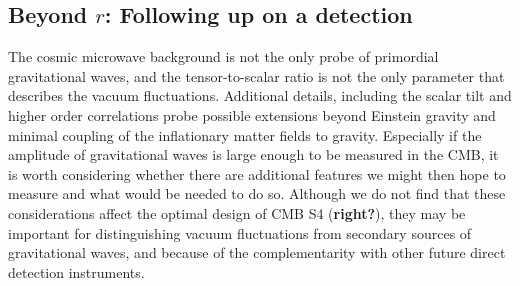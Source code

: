 \subsection{Beyond $r$: Following up on a detection}
\label{sec:beyond_r}
The cosmic microwave background is not the only probe of primordial gravitational waves, and the tensor-to-scalar ratio is not the only parameter that describes the vacuum fluctuations. Additional details, including the scalar tilt and higher order correlations probe possible extensions beyond Einstein gravity and minimal coupling of the inflationary matter fields to gravity. Especially if the amplitude of gravitational waves is large enough to be measured in the CMB, it is worth considering whether there are additional features we might then hope to measure and what would be needed to do so. Although we do not find that these considerations affect the optimal design of CMB S4 ({\bf right?}), they may be important for distinguishing vacuum fluctuations from secondary sources of gravitational waves, and because of the complementarity with other future direct detection instruments.

